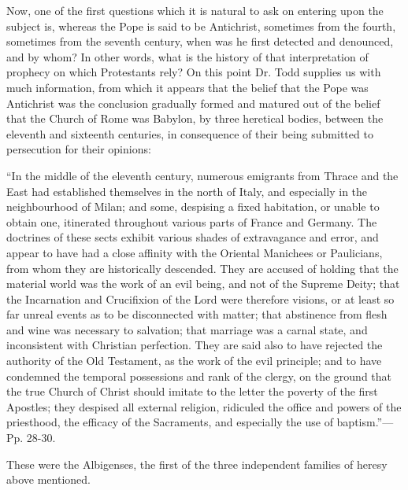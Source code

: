 Now, one of the first questions which it is natural to ask on
entering upon the subject is, whereas the Pope is said to be
Antichrist, sometimes from the fourth, sometimes from the seventh
century, when was he first detected and denounced, and by whom? In
other words, what is the history of that interpretation of prophecy on
which Protestants rely? On this point Dr. Todd supplies us with much
information, from which it appears that the belief that the Pope was
Antichrist was the conclusion gradually formed and matured out of the
belief that the Church of Rome was Babylon, by three heretical bodies,
between the eleventh and sixteenth centuries, in consequence of their
being submitted to persecution for their opinions:

``In the middle of the eleventh century, numerous emigrants
from Thrace and the East had established
themselves in the north of Italy, and especially in the neighbourhood
of Milan; and some, despising a fixed habitation, or unable to obtain
one, itinerated throughout various parts of France and Germany. The
doctrines of these sects exhibit various shades of extravagance and
error, and appear to have had a close affinity with the Oriental
Manichees or Paulicians, from whom they are historically descended.
They are accused of holding that the material world was the work of an
evil being, and not of the Supreme Deity; that the Incarnation and
Crucifixion of the Lord were therefore visions, or at least so far
unreal events as to be disconnected with matter; that abstinence from
flesh and wine was necessary to salvation; that marriage was a carnal
state, and inconsistent with Christian perfection. They are said also
to have rejected the authority of the Old Testament, as the work of
the evil principle; and to have condemned the temporal possessions and
rank of the clergy, on the ground that the true Church of Christ
should imitate to the letter the poverty of the first Apostles; they
despised all external religion, ridiculed the office and powers of the
priesthood, the efficacy of the Sacraments, and especially the use of
baptism.''—Pp. 28-30.

These were the Albigenses, the first of the three independent
families of heresy above mentioned.

